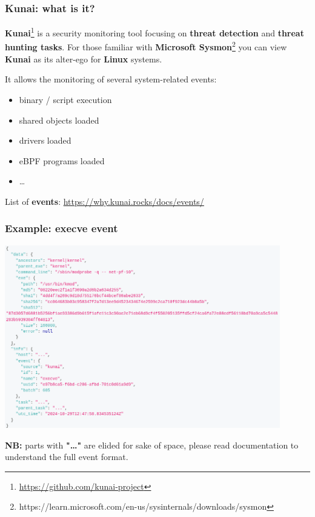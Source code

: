 \begin{frame}
	\frametitle{Kunai: what is it?}

	\textbf{Kunai}\footnote{\url{https://github.com/kunai-project}} is a security monitoring tool focusing on \textbf{threat detection} and \textbf{threat hunting tasks}. For those familiar with \textbf{Microsoft Sysmon}\footnote{https://learn.microsoft.com/en-us/sysinternals/downloads/sysmon} you can view \textbf{Kunai} as its alter-ego for \textbf{Linux} systems.

	\vspace{1em}

	\par
	It allows the monitoring of several system-related events:
	\begin{itemize}
		\item binary / script execution
		\item shared objects loaded
		\item drivers loaded
		\item eBPF programs loaded
		\item \ldots
	\end{itemize}

	\par
	\vspace{1em}
	List of \textbf{events}: \url{https://why.kunai.rocks/docs/events/}
\end{frame}

\begin{frame}
	\frametitle{Example: execve event}

	\centering
	\includegraphics[width=0.9\textwidth]{img/kunai-execve.png}

	\textbf{NB:} parts with \textbf{"\ldots"} are elided for sake of space, please read documentation to understand the full event format.
\end{frame}

